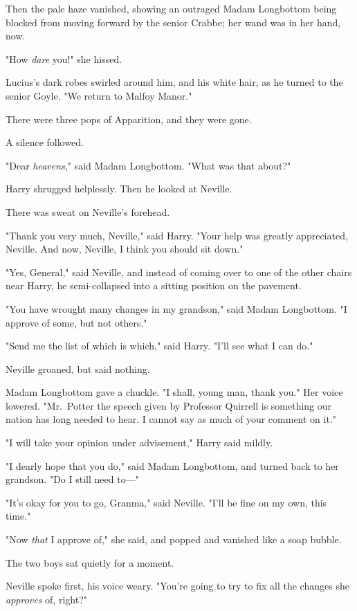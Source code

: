 Then the pale haze vanished, showing an outraged Madam Longbottom being blocked
from moving forward by the senior Crabbe; her wand was in her hand, now.

"How \emph{dare} you!" she hissed.

Lucius's dark robes swirled around him, and his white hair, as he turned to the
senior Goyle. "We return to Malfoy Manor."

There were three pops of Apparition, and they were gone.

A silence followed.

"Dear \emph{heavens}," said Madam Longbottom. "What was that about?"

Harry shrugged helplessly. Then he looked at Neville.

There was sweat on Neville's forehead.

"Thank you very much, Neville," said Harry. "Your help was greatly appreciated,
Neville. And now, Neville, I think you should sit down."

"Yes, General," said Neville, and instead of coming over to one of the other
chairs near Harry, he semi-collapsed into a sitting position on the pavement.

"You have wrought many changes in my grandson," said Madam Longbottom. "I
approve of some, but not others."

"Send me the list of which is which," said Harry. "I'll see what I can do."

Neville groaned, but said nothing.

Madam Longbottom gave a chuckle. "I shall, young man, thank you." Her voice
lowered. "Mr.~Potter{\el} the speech given by Professor Quirrell is
something our nation has long needed to hear. I cannot say as much of your
comment on it."

"I will take your opinion under advisement," Harry said mildly.

"I dearly hope that you do," said Madam Longbottom, and turned back to her
grandson. "Do I still need to---"

"It's okay for you to go, Granma," said Neville. "I'll be fine on my own, this
time."

"Now \emph{that} I approve of," she said, and popped and vanished like a soap
bubble.

The two boys sat quietly for a moment.

Neville spoke first, his voice weary. "You're going to try to fix all the
changes she \emph{approves} of, right?"

